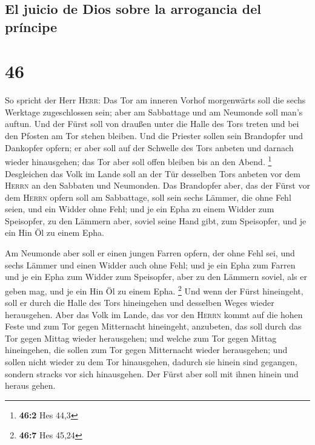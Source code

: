 \hypertarget{el-juicio-de-dios-sobre-la-arrogancia-del-pruxedncipe}{%
\subsection{El juicio de Dios sobre la arrogancia del
príncipe}\label{el-juicio-de-dios-sobre-la-arrogancia-del-pruxedncipe}}

\hypertarget{section-45}{%
\section{46}\label{section-45}}

 So spricht der Herr \textsc{Herr}: Das Tor am inneren
Vorhof morgenwärts soll die sechs Werktage zugeschlossen sein; aber am
Sabbattage und am Neumonde soll man's auftun.  Und der
Fürst soll von draußen unter die Halle des Tors treten und bei den
Pfosten am Tor stehen bleiben. Und die Priester sollen sein Brandopfer
und Dankopfer opfern; er aber soll auf der Schwelle des Tors anbeten und
darnach wieder hinausgehen; das Tor aber soll offen bleiben bis an den
Abend. \footnote{\textbf{46:2} Hes 44,3}  Desgleichen das
Volk im Lande soll an der Tür desselben Tors anbeten vor dem
\textsc{Herrn} an den Sabbaten und Neumonden.  Das
Brandopfer aber, das der Fürst vor dem \textsc{Herrn} opfern soll am
Sabbattage, soll sein sechs Lämmer, die ohne Fehl seien, und ein Widder
ohne Fehl;  und je ein Epha zu einem Widder zum
Speisopfer, zu den Lämmern aber, soviel seine Hand gibt, zum Speisopfer,
und je ein Hin Öl zu einem Epha.

 Am Neumonde aber soll er einen jungen Farren opfern, der
ohne Fehl sei, und sechs Lämmer und einen Widder auch ohne Fehl;
 und je ein Epha zum Farren und je ein Epha zum Widder zum
Speisopfer, aber zu den Lämmern soviel, als er geben mag, und je ein Hin
Öl zu einem Epha. \footnote{\textbf{46:7} Hes 45,24}  Und
wenn der Fürst hineingeht, soll er durch die Halle des Tors hineingehen
und desselben Weges wieder herausgehen.  Aber das Volk im
Lande, das vor den \textsc{Herrn} kommt auf die hohen Feste und zum Tor
gegen Mitternacht hineingeht, anzubeten, das soll durch das Tor gegen
Mittag wieder herausgehen; und welche zum Tor gegen Mittag hineingehen,
die sollen zum Tor gegen Mitternacht wieder herausgehen; und sollen
nicht wieder zu dem Tor hinausgehen, dadurch sie hinein sind gegangen,
sondern stracks vor sich hinausgehen.  Der Fürst aber
soll mit ihnen hinein und heraus gehen.

